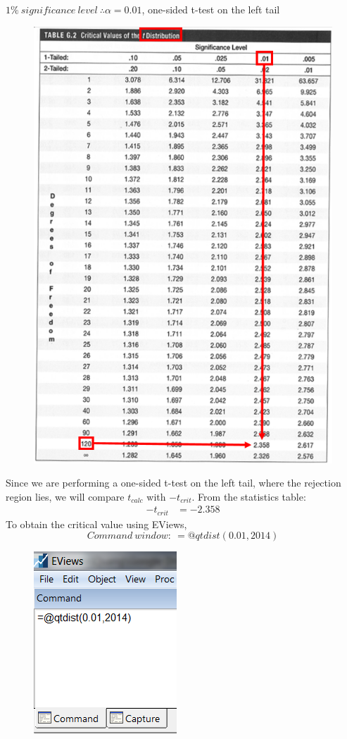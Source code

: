 \documentclass[12pt]{report}
\begin{document}
\noindent $1\%\ significance\ level\ \therefore \alpha = 0.01$, one-sided t-test on the left tail
\begin{figure}[H]
	\centering
	\includegraphics{tute6_q3_5}
\end{figure}
\vspace{-\baselineskip}
\noindent Since we are performing a one-sided t-test on the left tail, where the rejection region lies, we will compare $t_{calc}$ with $-t_{crit}$. From the statistics table: \begin{align*}
-t_{crit} &= -2.358
\end{align*}
\noindent To obtain the critical value using EViews,
$$Command\ window:\ =@qtdist(0.01,2014)$$
\begin{figure}[H]
	\centering
	\includegraphics{tute6_q3_6}
\end{figure}
\end{document}

